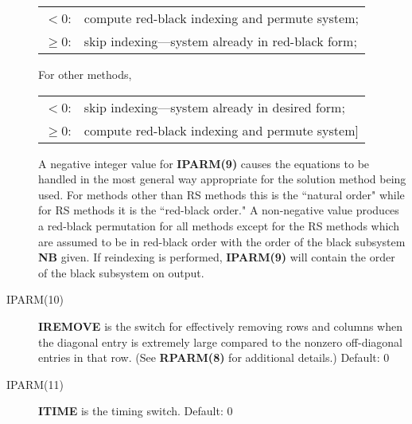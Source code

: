 \begin{description}
                 \begin{tabular}{rl} 
                  $<0$:     & compute red-black indexing and permute 
                              system; \\
                  $\geq 0$: & skip indexing---system already in red-black
                              form; 
                 \end{tabular}

                 \noindent
                 For other methods,

                 \begin{tabular}{rl} 
                  $<0$:     & skip indexing---system already in desired 
                              form; \\
                  $\geq 0$: & compute red-black indexing and permute 
                              system]
                 \end{tabular}

                 \noindent
                 A negative integer value for {\bf IPARM(9)} causes the
                 equations to be handled in the most general way
                 appropriate for the solution method being used.  For
                 methods other than RS methods this is the ``natural
                 order" while for RS methods it is the ``red-black order."
                 A non-negative value produces a red-black permutation
                 for all methods except for the RS methods which are
                 assumed to be in red-black order with the order of the
                 black subsystem {\bf NB} given.  If reindexing is performed,
                 {\bf IPARM(9)} will contain the order of the black subsystem
                 on output.
 
 \item[IPARM(10)] {\bf IREMOVE} is the switch for effectively removing
                  rows and columns when the diagonal entry is extremely 
                  large compared to the nonzero off-diagonal entries in 
                  that row.  (See {\bf RPARM(8)} for additional details.)
                  Default: $0$
 
 
 \item[IPARM(11)] {\bf ITIME} is the timing switch.  Default: $0$
 
 

\end{description}

